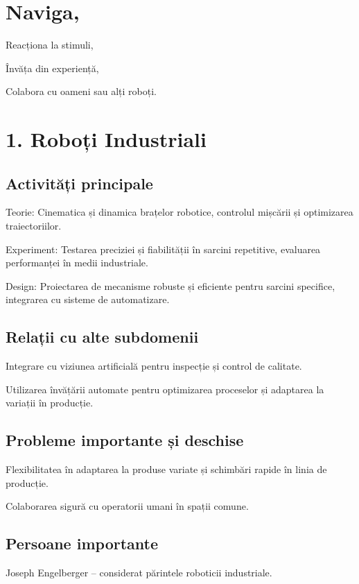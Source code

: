 \documentclass[12pt]{article}
\begin{document}
\section*{Naviga,}

Reacționa la stimuli,

Învăța din experiență,

Colabora cu oameni sau alți roboți.

\section{1. Roboți Industriali}

\subsection*{Activități principale}

Teorie: Cinematica și dinamica brațelor robotice, controlul mișcării și optimizarea traiectoriilor.

Experiment: Testarea preciziei și fiabilității în sarcini repetitive, evaluarea performanței în medii industriale.

Design: Proiectarea de mecanisme robuste și eficiente pentru sarcini specifice, integrarea cu sisteme de automatizare.

\subsection*{Relații cu alte subdomenii}

Integrare cu viziunea artificială pentru inspecție și control de calitate.

Utilizarea învățării automate pentru optimizarea proceselor și adaptarea la variații în producție.

\subsection*{Probleme importante și deschise}

Flexibilitatea în adaptarea la produse variate și schimbări rapide în linia de producție.

Colaborarea sigură cu operatorii umani în spații comune.

\subsection*{Persoane importante}

Joseph Engelberger – considerat părintele roboticii industriale.
\end{document}
